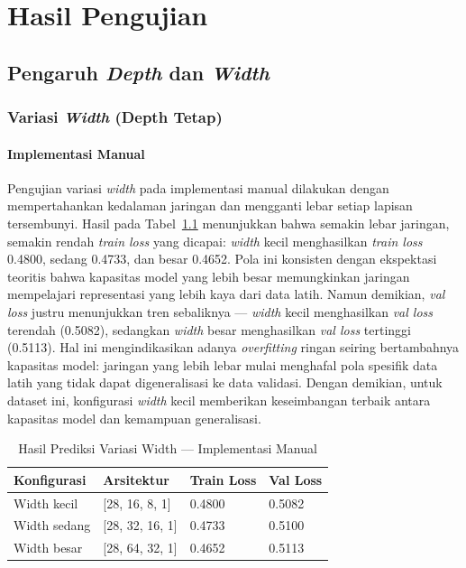 
\chapter{Hasil Pengujian}

\section{Pengaruh \textit{Depth} dan \textit{Width}}

\subsection{Variasi \textit{Width} (Depth Tetap)}

\subsubsection{Implementasi Manual}

Pengujian variasi \textit{width} pada implementasi manual dilakukan dengan mempertahankan kedalaman jaringan dan mengganti lebar setiap lapisan tersembunyi. Hasil pada Tabel~\ref{tab:width-ffnn} menunjukkan bahwa semakin lebar jaringan, semakin rendah \textit{train loss} yang dicapai: \textit{width} kecil menghasilkan \textit{train loss} 0.4800, sedang 0.4733, dan besar 0.4652. Pola ini konsisten dengan ekspektasi teoritis bahwa kapasitas model yang lebih besar memungkinkan jaringan mempelajari representasi yang lebih kaya dari data latih. Namun demikian, \textit{val loss} justru menunjukkan tren sebaliknya — \textit{width} kecil menghasilkan \textit{val loss} terendah (0.5082), sedangkan \textit{width} besar menghasilkan \textit{val loss} tertinggi (0.5113). Hal ini mengindikasikan adanya \textit{overfitting} ringan seiring bertambahnya kapasitas model: jaringan yang lebih lebar mulai menghafal pola spesifik data latih yang tidak dapat digeneralisasi ke data validasi. Dengan demikian, untuk dataset ini, konfigurasi \textit{width} kecil memberikan keseimbangan terbaik antara kapasitas model dan kemampuan generalisasi.

\begin{table}[H]
    \centering
    \caption{Hasil Prediksi Variasi Width — Implementasi Manual}
    \begin{tabular}{llll}
        \toprule
        \textbf{Konfigurasi} & \textbf{Arsitektur} & \textbf{Train Loss} & \textbf{Val Loss} \\
        \midrule
        Width kecil  & [28, 16, 8, 1]  & 0.4800 & 0.5082 \\
        Width sedang & [28, 32, 16, 1] & 0.4733 & 0.5100 \\
        Width besar  & [28, 64, 32, 1] & 0.4652 & 0.5113 \\
        \bottomrule
    \end{tabular}
    \label{tab:width-ffnn}
\end{table}

